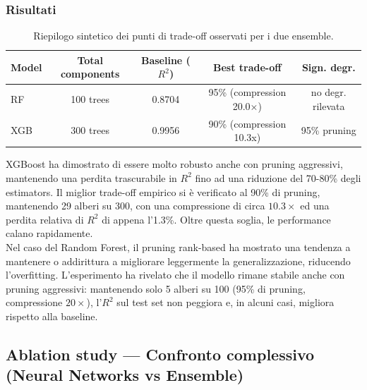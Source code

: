 \documentclass[a4paper,12pt]{report}
\begin{document}
	\subsubsection{Risultati}
	\begin{table}[H]
		\centering
		\setlength{\tabcolsep}{4pt}
		\begin{tabular}{lcccc}
			\toprule
			\textbf{Model} & \textbf{Total components} & \textbf{Baseline (\(R^2\))} & \textbf{Best trade-off} & \textbf{Sign. degr.} \\
			\midrule
			RF        & 100 trees & 0.8704 & 95\% (compression 20.0×) & no degr. rilevata \\
			XGB       & 300 trees & 0.9956 & 90\% (compression 10.3x) & 95\% pruning \\
			\bottomrule
		\end{tabular}
		\caption{Riepilogo sintetico dei punti di trade-off osservati per i due ensemble.}
	\end{table}
	
	XGBoost ha dimostrato di essere molto robusto anche con pruning aggressivi, mantenendo una perdita trascurabile in \(R^2\) fino ad una riduzione del 70-80\% degli estimators. Il miglior trade-off empirico si è verificato al 90\% di pruning, mantenendo 29 alberi su 300, con una compressione di circa $10.3\times$ ed una perdita relativa di \(R^2\) di appena l'1.3\%. Oltre questa soglia, le performance calano rapidamente. \\
	Nel caso del Random Forest, il pruning rank-based ha mostrato una tendenza a mantenere o addirittura a migliorare leggermente la generalizzazione, riducendo l'overfitting. L'esperimento ha rivelato che il modello rimane stabile anche con pruning aggressivi: mantenendo solo 5 alberi su 100 (95\% di pruning, compressione $20\times$), l'\(R^2\) sul test set non peggiora e, in alcuni casi, migliora rispetto alla baseline.
	
	\subsection{Ablation study — Confronto complessivo (Neural Networks vs Ensemble)}
	
\end{document}
